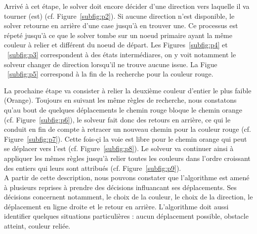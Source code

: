 Arrivé à cet étape, le solver doit encore décider d'une direction vers laquelle il va tourner (est) (cf. Figure~\vref{subfig:p2}). Si aucune direction n'est disponible, le solver retourne en arrière d'une case jusqu'à en trouver une. Ce processus est répeté jusqu'à ce que le solver tombe sur un noeud primaire ayant la même couleur à relier et différent du noeud de départ. Les Figures~\vref{subfig:p4} et ~\vref{subfig:p3} correspondent à des états intermédiares, on y voit notamment le solveur changer de direction lorsqu'il ne trouve aucune issue. La Figue ~\vref{subfig:p5} correspond à la fin de la recherche pour la couleur rouge.

La prochaine étape va consister à relier la deuxième couleur d'entier le plus faible (Orange). Toujours en suivant les même règles de recherche, nous constatons qu'au bout de quelques déplacements le chemin rouge bloque le chemin orange (cf. Figure~\vref{subfig:p6}), le solveur fait donc des retours en arrière, ce qui le conduit en fin de compte à retracer un nouveau chemin pour la couleur rouge (cf. Figure~\vref{subfig:p7}). Cette fois-çi la voie est libre pour le chemin orange qui peut se déplacer vers l'est (cf. Figure~\vref{subfig:p8}). Le solveur va continuer ainsi à appliquer les mêmes règles jusqu'à relier toutes les couleurs dans l'ordre croissant des entiers qui leurs sont attribués (cf. Figure~\vref{subfig:p9}).\\

A partir de cette description, nous pouvons constater que l'algorithme est amené à plusieurs reprises à prendre des décisions influancant ses déplacements. Ses décisions concernent notamment, le choix de la couleur, le choix de la direction, le déplacement en ligne droite et le retour en arrière. L'algorithme doit aussi identifier quelques situations particulières : aucun déplacement possible, obstacle atteint, couleur reliée.

